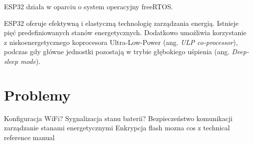 ESP32 działa w oparciu o system operacyjny freeRTOS.

ESP32 oferuje efektywną i elastyczną technologię zarządzania energią. Istnieje pięć predefiniowanych stanów energetycznych. Dodatkowo umożliwia korzystanie z niskoenergetycznego koprocesora Ultra-Low-Power (ang. \textit{ULP co-processor}), podczas gdy główne jednostki pozostają w trybie głębokiego uśpienia (ang. \textit{Deep-sleep mode}).~\cite{esp32-tech-ref-man}


\section{Problemy}
Konfiguracja WiFi?
Sygnalizacja stanu baterii?
Bezpieczeństwo komunikacji
zarządzanie stanami energetycznymi
Enkrypcja flash
mozna cos z technical reference manual